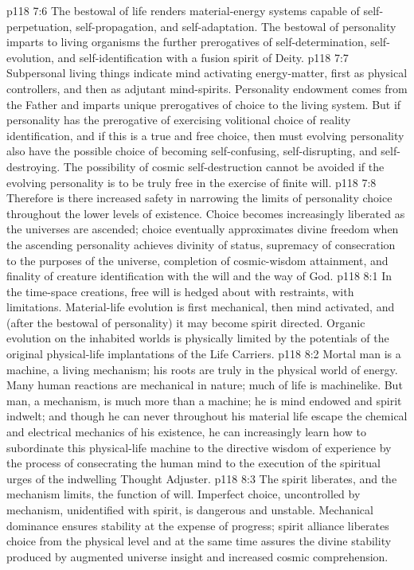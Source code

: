 \vs p118 7:6 \pc The bestowal of life renders material\hyp{}energy systems capable of self\hyp{}perpetuation, self\hyp{}propagation, and self\hyp{}adaptation. The bestowal of personality imparts to living organisms the further prerogatives of self\hyp{}determination, self\hyp{}evolution, and self\hyp{}identification with a fusion spirit of Deity.
\vs p118 7:7 Subpersonal living things indicate mind activating energy\hyp{}matter, first as physical controllers, and then as adjutant mind\hyp{}spirits. Personality endowment comes from the Father and imparts unique prerogatives of choice to the living system. But if personality has the prerogative of exercising volitional choice of reality identification, and if this is a true and free choice, then must evolving personality also have the possible choice of becoming self\hyp{}confusing, self\hyp{}disrupting, and self\hyp{}destroying. The possibility of cosmic self\hyp{}destruction cannot be avoided if the evolving personality is to be truly free in the exercise of finite will.
\vs p118 7:8 Therefore is there increased safety in narrowing the limits of personality choice throughout the lower levels of existence. Choice becomes increasingly liberated as the universes are ascended; choice eventually approximates divine freedom when the ascending personality achieves divinity of status, supremacy of consecration to the purposes of the universe, completion of cosmic\hyp{}wisdom attainment, and finality of creature identification with the will and the way of God.
\vs p118 8:1 In the time\hyp{}space creations, free will is hedged about with restraints, with limitations. Material\hyp{}life evolution is first mechanical, then mind activated, and (after the bestowal of personality) it may become spirit directed. Organic evolution on the inhabited worlds is physically limited by the potentials of the original physical\hyp{}life implantations of the Life Carriers.
\vs p118 8:2 Mortal man is a machine, a living mechanism; his roots are truly in the physical world of energy. Many human reactions are mechanical in nature; much of life is machinelike. But man, a mechanism, is much more than a machine; he is mind endowed and spirit indwelt; and though he can never throughout his material life escape the chemical and electrical mechanics of his existence, he can increasingly learn how to subordinate this physical\hyp{}life machine to the directive wisdom of experience by the process of consecrating the human mind to the execution of the spiritual urges of the indwelling Thought Adjuster.
\vs p118 8:3 \pc The spirit liberates, and the mechanism limits, the function of will. Imperfect choice, uncontrolled by mechanism, unidentified with spirit, is dangerous and unstable. Mechanical dominance ensures stability at the expense of progress; spirit alliance liberates choice from the physical level and at the same time assures the divine stability produced by augmented universe insight and increased cosmic comprehension.
